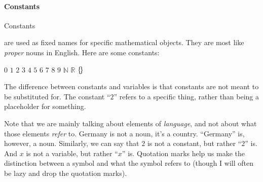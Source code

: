 \documentclass[12pt]{article}
\def\N{\mathbb{N}}
\def\R{\mathbb{R}}
\renewcommand{\emptyset}{\{\hspace{-2pt}\}}
\begin{document}
\paragraph{Constants}
\hypertarget{hl:constants}{Constants} are used as fixed names for specific mathematical objects.
They are most like \emph{proper} nouns in English.
Here are some constants:
\begin{center}
$0$ \sp $1$ \sp $2$ \sp $3$ \sp $4$ \sp $5$ \sp $6$ \sp $7$ \sp $8$ \sp $9$ \sp $\N$ \sp $\R$ \sp $\emptyset$
\end{center}
The difference between constants and variables is that constants are not meant to be substituted for.
The constant ``$2$'' refers to a specific thing, rather than being a placeholder for something.


Note that we are mainly talking about elements of \emph{language}, and not about what those elements \emph{refer} to.
Germany is not a noun, it's a country. ``Germany'' is, however, a noun.
Similarly, we can say that $2$ is not a constant, but rather ``$2$'' is.
And $x$ is not a variable, but rather ``$x$'' is.
Quotation marks help us make the distinction between a symbol and what the symbol refers to
(though I will often be lazy and drop the quotation marks).




\def\sp{\hspace{1em}}
\end{document}
